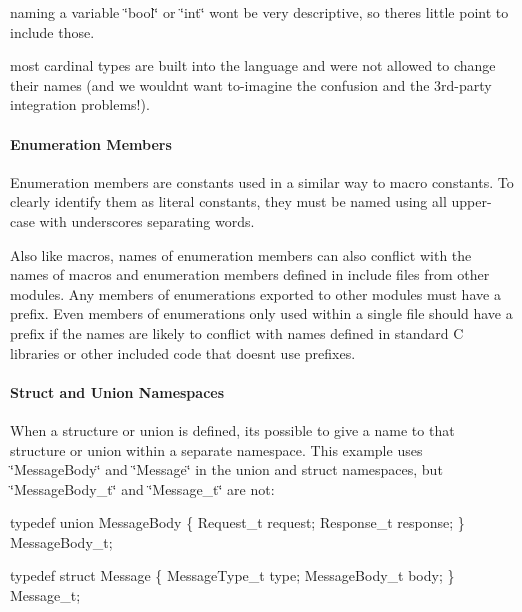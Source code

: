 \begin{DoxyItemize}
\item naming a variable \char`\"{}bool\char`\"{} or \char`\"{}int\char`\"{} won\textquotesingle{}t be very descriptive, so there\textquotesingle{}s little point to include those.
\item most cardinal types are built into the language and we\textquotesingle{}re not allowed to change their names (and we wouldn\textquotesingle{}t want to-\/imagine the confusion and the 3rd-\/party integration problems!).
\end{DoxyItemize}\hypertarget{ccoding_stds_name_types_cstdsEnumerationMembers}{}\paragraph{Enumeration Members}\label{ccoding_stds_name_types_cstdsEnumerationMembers}
Enumeration members are constants used in a similar way to macro constants. To clearly identify them as literal constants, they must be named using all upper-\/case with underscores separating words.

Also like macros, names of enumeration members can also conflict with the names of macros and enumeration members defined in include files from other modules. Any members of enumerations exported to other modules must have a prefix. Even members of enumerations only used within a single file should have a prefix if the names are likely to conflict with names defined in standard C libraries or other included code that doesn\textquotesingle{}t use prefixes.\hypertarget{ccoding_stds_name_types_cstdsStructandUnionNamespaces}{}\paragraph{Struct and Union Namespaces}\label{ccoding_stds_name_types_cstdsStructandUnionNamespaces}
When a structure or union is defined, it\textquotesingle{}s possible to give a name to that structure or union within a separate namespace. This example uses \char`\"{}\+Message\+Body\char`\"{} and \char`\"{}\+Message\char`\"{} in the union and struct namespaces, but \char`\"{}\+Message\+Body\+\_\+t\char`\"{} and \char`\"{}\+Message\+\_\+t\char`\"{} are not\+:


\begin{DoxyCode}
\textcolor{keyword}{typedef} \textcolor{keyword}{union }MessageBody
\{
    Request\_t request;
    Response\_t response;
\}
MessageBody\_t;

\textcolor{keyword}{typedef} \textcolor{keyword}{struct }Message
\{
    MessageType\_t type;
    MessageBody\_t body;
\}
Message\_t;
\end{DoxyCode}


